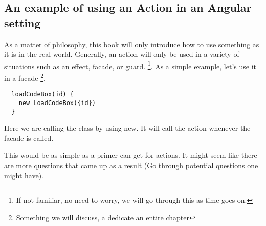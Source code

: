 \subsection{An example of using an Action in an Angular setting}
As a matter of philosophy, this book will only introduce how to use something
as it is in the real world. Generally, an action will only be used in a variety
of situations such as an effect, facade, or guard. \footnote{If not familiar, no
need to worry, we will go through this as time goes on.}. As a simple example,
let's use it in a facade \footnote{Something we will discuss, a dedicate an
entire chapter}.

\begin{lstlisting}
  loadCodeBox(id) {
    new LoadCodeBox({id})
  }
\end{lstlisting}

Here we are calling the class by using new. It will call the action whenever the
facade is called.

This would be as simple as a primer can get for actions. It might seem like
there are more questions that came up as a result (Go through potential
questions one might have).
